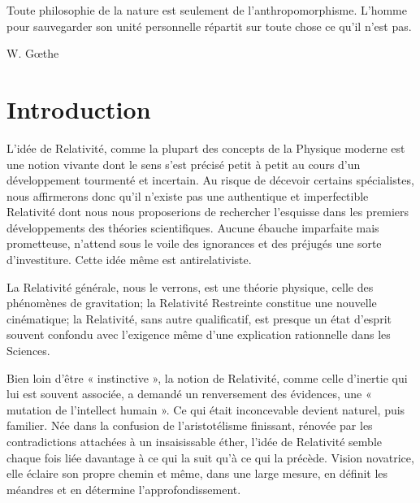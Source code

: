 

\begin{minipage}{0.5\textwidth}
\begin{flushleft} \large
%
\end{flushleft}
\end{minipage}
\begin{minipage}{0.5\textwidth}
Toute philosophie de la nature est seulement de
l’anthropomorphisme. L’homme pour sauvegarder son
unité personnelle répartit sur toute chose ce qu’il n’est pas.

\hfill {\sc W. G{\oe}the}

\end{minipage}


\section{Introduction}


L'idée de Relativité, comme la plupart des concepts de la Physique
moderne est une notion vivante dont le sens s’est précisé petit à petit
au cours d’un développement tourmenté et incertain. Au risque de
décevoir certains spécialistes, nous affirmerons donc qu’il n’existe pas
une authentique et imperfectible Relativité dont nous nous proposerions
de rechercher l’esquisse dans les premiers développements des théories
scientifiques. Aucune ébauche imparfaite mais prometteuse, n’attend sous
le voile des ignorances et des préjugés une sorte d’investiture. Cette idée
même est antirelativiste.

La Relativité générale, nous le verrons, est une théorie physique, celle
des phénomènes de gravitation; la Relativité Restreinte constitue une
nouvelle cinématique; la Relativité, sans autre qualificatif, est presque
un état d’esprit souvent confondu avec l’exigence même d’une explication
 rationnelle dans les Sciences.

Bien loin d’être « instinctive », la notion de Relativité, comme celle
d'inertie qui lui est souvent associée, a demandé un renversement des
évidences, une « mutation de l’intellect humain ». Ce qui était inconcevable
devient naturel, puis familier. Née dans la confusion de l’aristotélisme
finissant, rénovée par les contradictions attachées à un insaisissable
éther, l’idée de Relativité semble chaque fois liée davantage à ce
qui la suit qu’à ce qui la précède. Vision novatrice, elle éclaire son propre
chemin et même, dans une large mesure, en définit les méandres et en
détermine l’approfondissement.

